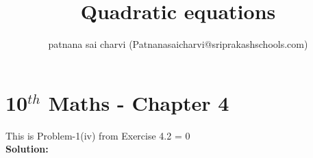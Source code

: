 

\newcommand{\mydet}[1]{\ensuremath{\begin{vmatrix}#1\end{vmatrix}}}
\newcommand{\solution}{\noindent \textbf{Solution: }}
\providecommand{\brak}[1]{\ensuremath{\left(#1\right)}}
\providecommand{\norm}[1]{\left\lVert#1\right\rVert}
\let\vec\mathbf

\title{Quadratic equations}
\author{patnana sai charvi (Patnanasaicharvi@sriprakashschools.com)}

\section*{10$^{th}$ Maths - Chapter 4}
This is Problem-1(iv) from Exercise 4.2
= 0\\

\solution\\
\\
\\
\\
\\
\\
\\

